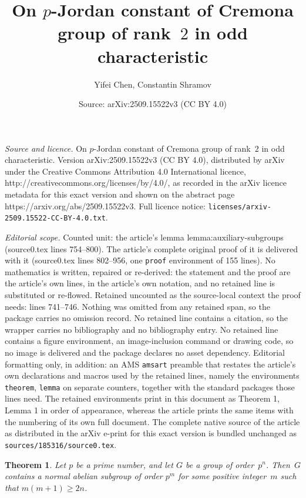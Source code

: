 \documentclass[10pt,a4paper]{amsart}
\title{On $p$-Jordan constant of Cremona group of rank~$2$ in odd characteristic}
\author{Yifei Chen, Constantin Shramov}
\date{Source: arXiv:2509.15522v3 (CC BY 4.0)}
\newtheorem{theorem}{Theorem}
\def \ge {\geqslant}
\begin{document}
\maketitle

\noindent\emph{Source and licence.} On $p$-Jordan constant of Cremona group of rank~$2$ in odd characteristic. Version arXiv:2509.15522v3 (CC BY 4.0), distributed by arXiv under the Creative Commons Attribution 4.0 International licence, http://creativecommons.org/licenses/by/4.0/, as recorded in the arXiv licence metadata for this exact version and shown on the abstract page https://arxiv.org/abs/2509.15522v3. Full licence notice: \texttt{licenses/arxiv-2509.15522-CC-BY-4.0.txt}.\par\smallskip

\noindent\textit{Editorial scope.} Counted unit: the article's lemma lemma:auxiliary-subgroups (source0.tex lines 754--800). The article's complete original proof of it is delivered with it (source0.tex lines 802--956, one \texttt{proof} environment of 155 lines). No mathematics is written, repaired or re-derived: the statement and the proof are the article's own lines, in the article's own notation, and no retained line is substituted or re-flowed.  Retained uncounted as the source-local context the proof needs: lines 741--746.  Nothing was omitted from any retained span, so the package carries no omission record.  No retained line contains a citation, so the wrapper carries no bibliography and no bibliography entry.  No retained line contains a figure environment, an image-inclusion command or drawing code, so no image is delivered and the package declares no asset dependency.  Editorial formatting only, in addition: an AMS \texttt{amsart} preamble that restates the article's own declarations and macros used by the retained lines, namely the environments \texttt{theorem}, \texttt{lemma} on separate counters, together with the standard packages those lines need.  The retained environments print in this document as Theorem 1, Lemma 1 in order of appearance, whereas the article prints the same items with the numbering of its own full document.  The complete native source of the article as distributed in the arXiv e-print for this exact version is bundled unchanged as \texttt{sources/185316/source0.tex}.
\begin{theorem}
\label{theorem:normal-in-a-p-group}
Let $p$ be a prime number, and let $G$ be a group of order~$p^n$.
Then~$G$ contains a normal abelian subgroup of order $p^m$ for some
positive integer~$m$ such that $m(m+1)\ge 2n$.
\end{theorem}
\end{document}
